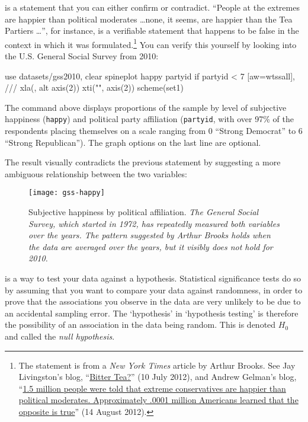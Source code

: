  is a statement that you can either confirm or contradict. ``People at the extremes are happier than political moderates \dots none, it seems, are happier than the Tea Partiers \dots'', for instance, is a verifiable statement that happens to be false in the context in which it was formulated.\footnote{The statement is from a \emph{New York Times} article by Arthur Brooks. See Jay Livingston's blog, ``\href{http://montclairsoci.blogspot.ch/2012/07/bitter-tea.html}{Bitter Tea?}'' (10 July 2012), and Andrew Gelman's blog, ``\href{http://andrewgelman.com/2012/08/1-5-million-people-were-told-that-extreme-conservatives-are-happier-than-political-moderates-approximately-0001-million-americans-learned-that-the-opposite-is-true/}{1.5 million people were told that extreme conservatives are happier than political moderates. Approximately .0001 million Americans learned that the opposite is true}'' (14 August 2012).} You can verify this yourself by looking into the U.S. General Social Survey from 2010:%

\begin{docspec}
use datasets/gss2010, clear
spineplot happy partyid if partyid < 7 [aw=wtssall], ///
    xla(, alt axis(2)) xti("", axis(2)) scheme(set1)
\end{docspec}

The  command above displays proportions of the sample by level of subjective happiness (\texttt{happy}) and political party affiliation (\texttt{partyid}, with over 97\% of the respondents placing themselves on a scale ranging from 0 ``Strong Democrat'' to 6 ``Strong Republican''). The graph options on the last line are optional.

The result visually contradicts the previous statement by suggesting a more ambiguous relationship between the two variables:

\begin{figure}
  \texttt{[image: gss-happy]}
  \caption[Subjective happiness by political affiliation.]%
  {Subjective happiness by political affiliation. %
  \emph{The General Social Survey, which started in 1972, has repeatedly measured both variables over the years. The pattern suggested by Arthur Brooks holds when the data are averaged over the years, but it visibly does not hold for 2010.}}%
  \label{fig:stata-window}
\end{figure}

 is a way to test your data against a hypothesis. Statistical significance tests do so by assuming that you want to compare your data against randomness, in order to prove that the associations you observe in the data are very unlikely to be due to an accidental sampling error. The `hypothesis' in `hypothesis testing' is therefore the possibility of an association in the data being random. This is denoted $H_0$ and called the \emph{null hypothesis}.

